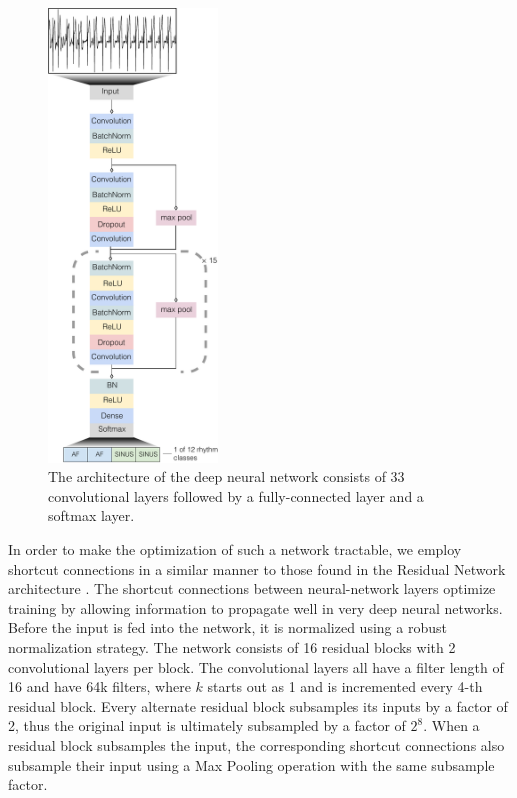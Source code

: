 \begin{figure}
\centering
\includegraphics[width=0.4\textwidth]{arrhythmias/figures/ecg_network_full.pdf}
\caption{The architecture of the deep neural network consists of 33
         convolutional layers followed by a fully-connected layer and
         a softmax layer.}
\end{figure}

In order to make the optimization of such a network tractable, we employ
shortcut connections in a similar manner to those found in the Residual Network
architecture \cite{he2016identity}. The shortcut connections between
neural-network layers optimize training by allowing information to propagate
well in very deep neural networks. Before the input is fed into the network, it
is normalized using a robust normalization strategy. The network consists of
16 residual blocks with 2 convolutional layers per block. The convolutional
layers all have a filter length of 16 and have 64k filters, where $k$
starts out as 1 and is incremented every 4-th residual block. Every
alternate residual block subsamples its inputs by a factor of 2, thus the
original input is ultimately subsampled by a factor of $2^8$. When a residual
block subsamples the input, the corresponding shortcut connections also
subsample their input using a Max Pooling operation with the same subsample
factor. 

